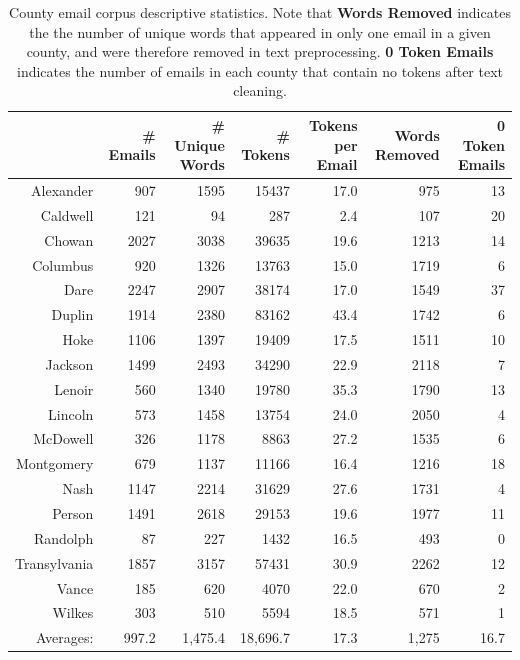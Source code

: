 \documentclass{pnastwo}
\begin{document}
\begin{article}


\begin{table}[ht]
\centering
\begin{tabular}{rrrrrrr}
  \toprule
 & \# Emails & \# Unique Words & \# Tokens & Tokens per Email & Words Removed & 0 Token Emails \\ 
  \midrule
Alexander & 907 & 1595 & 15437 & 17.0 & 975 & 13 \\ 
\rowcolor{lred}
  Caldwell & 121 & 94 & 287 & 2.4 & 107 & 20 \\ 
  Chowan & 2027 & 3038 & 39635 & 19.6 & 1213 & 14 \\ 
  Columbus & 920 & 1326 & 13763 & 15.0 & 1719 & 6 \\ 
  Dare & 2247 & 2907 & 38174 & 17.0 & 1549 & 37 \\ 
  Duplin & 1914 & 2380 & 83162 & 43.4 & 1742 & 6 \\ 
  Hoke & 1106 & 1397 & 19409 & 17.5 & 1511 & 10 \\ 
  Jackson & 1499 & 2493 & 34290 & 22.9 & 2118 & 7 \\ 
  Lenoir & 560 & 1340 & 19780 & 35.3 & 1790 & 13 \\ 
  Lincoln & 573 & 1458 & 13754 & 24.0 & 2050 & 4 \\ 
  McDowell & 326 & 1178 & 8863 & 27.2 & 1535 & 6 \\ 
  Montgomery & 679 & 1137 & 11166 & 16.4 & 1216 & 18 \\ 
  Nash & 1147 & 2214 & 31629 & 27.6 & 1731 & 4 \\ 
  Person & 1491 & 2618 & 29153 & 19.6 & 1977 & 11 \\
  \rowcolor{lred} 
  Randolph & 87 & 227 & 1432 & 16.5 & 493 & 0 \\ 
  Transylvania & 1857 & 3157 & 57431 & 30.9 & 2262 & 12 \\ 
  Vance & 185 & 620 & 4070 & 22.0 & 670 & 2 \\ 
  Wilkes & 303 & 510 & 5594 & 18.5 & 571 & 1 \\
  \midrule
  Averages: & 997.2 &  1,475.4 & 18,696.7 & 17.3 & 1,275 & 16.7 \\
   \bottomrule
\end{tabular}
\caption{\label{tab:corpus desc stats} County email corpus descriptive statistics. Note that \textbf{Words Removed} indicates the the number of unique words that appeared in only one email in a given county, and were therefore removed in text preprocessing. \textbf{0 Token Emails} indicates the number of emails in each county that contain no tokens after text cleaning.}
\end{table}


\end{article}
\end{document}
